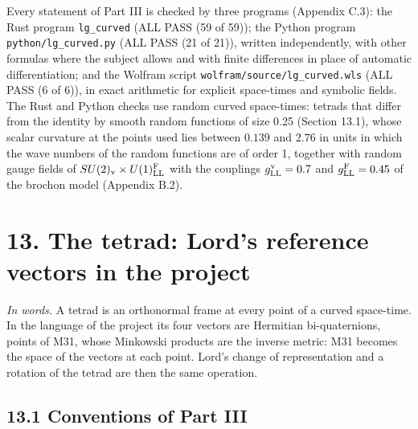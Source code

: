 \documentclass[
  10pt,
]{article}
\begin{document}
Every statement of Part III is checked by three programs (Appendix C.3):
the Rust program \texttt{lg\_curved} (ALL PASS (59 of 59)); the Python
program \texttt{python/lg\_curved.py} (ALL PASS (21 of 21)), written
independently, with other formulas where the subject allows and with
finite differences in place of automatic differentiation; and the
Wolfram script \texttt{wolfram/source/lg\_curved.wls} (ALL PASS (6 of
6)), in exact arithmetic for explicit space-times and symbolic fields.
The Rust and Python checks use random curved space-times: tetrads that
differ from the identity by smooth random functions of size 0.25
(Section 13.1), whose scalar curvature at the points used lies between
\(0.139\) and \(2.76\) in units in which the wave numbers of the random
functions are of order 1, together with random gauge fields of
\(SU(2)_{\rm v}\times U(1)^{\rm F}_{\rm LL}\) with the couplings
\(g^{\rm v}_{\rm LL}=0.7\) and \(g^{\rm F}_{\rm LL}=0.45\) of the
brochon model (Appendix B.2).

\hypertarget{the-tetrad-lords-reference-vectors-in-the-project}{%
\section{13. The tetrad: Lord's reference vectors in the
project}\label{the-tetrad-lords-reference-vectors-in-the-project}}

\emph{In words.} A tetrad is an orthonormal frame at every point of a
curved space-time. In the language of the project its four vectors are
Hermitian bi-quaternions, points of M31, whose Minkowski products are
the inverse metric: M31 becomes the space of the vectors at each point.
Lord's change of representation and a rotation of the tetrad are then
the same operation.

\hypertarget{conventions-of-part-iii}{%
\subsection{13.1 Conventions of Part
III}\label{conventions-of-part-iii}}
\end{document}
